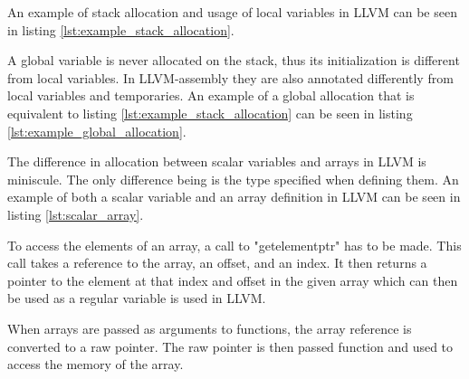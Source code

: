 An example of stack allocation and usage of local variables in LLVM can be seen in listing \ref{lst:example_stack_allocation}.



A global variable is never allocated on the stack, thus its initialization is different from local variables. In LLVM-assembly they are also annotated differently from local variables and temporaries.
An example of a global allocation that is equivalent to listing \ref{lst:example_stack_allocation} can be seen in listing \ref{lst:example_global_allocation}.



The difference in allocation between scalar variables and arrays in LLVM is miniscule. The only difference being is the type specified when defining them. An example of both a scalar variable and an array definition in LLVM can be seen in listing \ref{lst:scalar_array}.

To access the elements of an array, a call to "getelementptr" has to be made. This call takes a reference to the array, an offset, and an index. It then returns a pointer to the element at that index and offset in the given array which can then be used as a regular variable is used in LLVM.

When arrays are passed as arguments to functions, the array reference is converted to a raw pointer. The raw pointer is then passed function and used to access the memory of the array.



